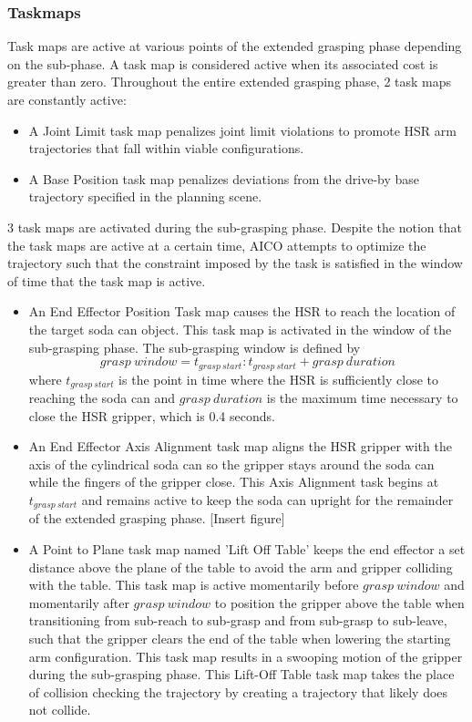 \documentclass[12pt]{article}
\begin{document}
            \subsubsection{Taskmaps}
                Task maps are active at various points of the extended grasping phase depending on the sub-phase. A task map is considered active when its associated cost is greater than zero. Throughout the entire extended grasping phase, 2 task maps are constantly active:
                \begin{itemize}
                    \item A Joint Limit task map penalizes joint limit violations to promote HSR arm trajectories that fall within viable configurations.

                    \item A Base Position task map penalizes deviations from the drive-by base trajectory specified in the planning scene.
                \end{itemize}
                3 task maps are activated during the sub-grasping phase. Despite the notion that the task maps are active at a certain time, AICO attempts to optimize the trajectory such that the constraint imposed by the task is satisfied in the window of time that the task map is active.
                \begin{itemize}
                    \item An End Effector Position Task map causes the HSR to reach the location of the target soda can object. This task map is activated in the window of the sub-grasping phase. The sub-grasping window is defined by 
                    \[{grasp\ window} = t_{grasp\ start}: t_{grasp\ start}+grasp\  duration\] 
                    where \(t_{grasp\ start}\) is the point in time where the HSR is sufficiently close to reaching the soda can and \({grasp\ duration}\) is the maximum time necessary to close the HSR gripper, which is 0.4 seconds.

                    \item An End Effector Axis Alignment task map aligns the HSR gripper with the axis of the cylindrical soda can so the gripper stays around the soda can while the fingers of the gripper close. This Axis Alignment task begins at \(t_{grasp\ start}\) and remains active to keep the soda can upright for the remainder of the extended grasping phase.
                    [Insert figure]

                    \item A Point to Plane task map named 'Lift Off Table' keeps the end effector a set distance above the plane of the table to avoid the arm and gripper colliding with the table. This task map is active momentarily before \({grasp\ window}\) and momentarily after \({grasp\ window}\) to position the gripper above the table when transitioning from sub-reach to sub-grasp and from sub-grasp to sub-leave, such that the gripper clears the end of the table when lowering the starting arm configuration. This task map results in a swooping motion of the gripper during the sub-grasping phase. This Lift-Off Table task map takes the place of collision checking the trajectory by creating a trajectory that likely does not collide.
                \end{itemize}
\end{document}

